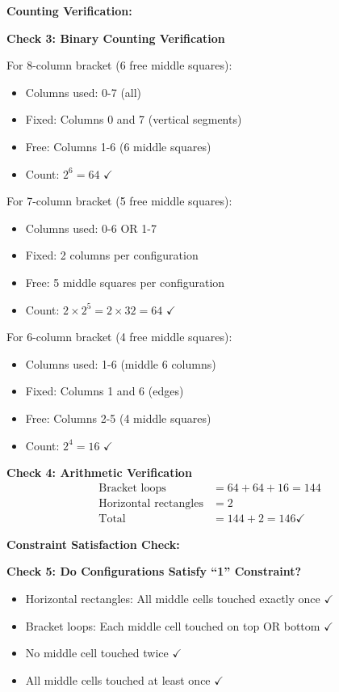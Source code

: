 \documentclass[12pt]{article}
\begin{document}
\begin{verificationbox}
\textbf{Counting Verification:}

\textbf{Check 3: Binary Counting Verification}

For 8-column bracket (6 free middle squares):
\begin{itemize}
    \item Columns used: 0-7 (all)
    \item Fixed: Columns 0 and 7 (vertical segments)
    \item Free: Columns 1-6 (6 middle squares)
    \item Count: $2^6 = 64$ $\checkmark$
\end{itemize}

For 7-column bracket (5 free middle squares):
\begin{itemize}
    \item Columns used: 0-6 OR 1-7
    \item Fixed: 2 columns per configuration
    \item Free: 5 middle squares per configuration
    \item Count: $2 \times 2^5 = 2 \times 32 = 64$ $\checkmark$
\end{itemize}

For 6-column bracket (4 free middle squares):
\begin{itemize}
    \item Columns used: 1-6 (middle 6 columns)
    \item Fixed: Columns 1 and 6 (edges)
    \item Free: Columns 2-5 (4 middle squares)
    \item Count: $2^4 = 16$ $\checkmark$
\end{itemize}

\textbf{Check 4: Arithmetic Verification}
\begin{align*}
\text{Bracket loops} &= 64 + 64 + 16 = 144 \\
\text{Horizontal rectangles} &= 2 \\
\text{Total} &= 144 + 2 = 146 \checkmark
\end{align*}

\textbf{Constraint Satisfaction Check:}

\textbf{Check 5: Do Configurations Satisfy ``1'' Constraint?}
\begin{itemize}
    \item Horizontal rectangles: All middle cells touched exactly once $\checkmark$
    \item Bracket loops: Each middle cell touched on top OR bottom $\checkmark$
    \item No middle cell touched twice $\checkmark$
    \item All middle cells touched at least once $\checkmark$
\end{itemize}


\end{verificationbox}
\end{document}
